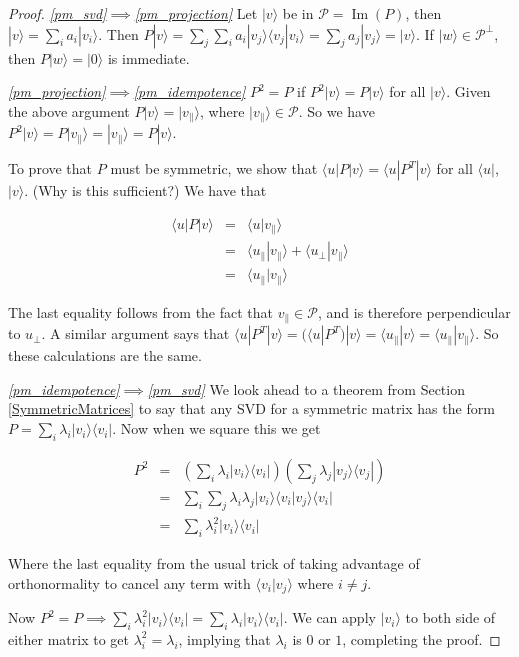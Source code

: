 \documentclass{amsbook}
\begin{document}
\begin{proof}
{\em \ref{pm_svd}$\implies$\ref{pm_projection}} Let $|v\rangle$ be in $\mathcal P=\operatorname{Im}(P)$, then $|v\rangle=\sum_ia_i|v_i\rangle$.  Then $P|v\rangle=\sum_j\sum_ia_i|v_j\rangle\langle v_j|v_i\rangle=\sum_ja_j|v_j\rangle=|v\rangle$.  If $|w\rangle\in\mathcal P^\bot$, then $P|w\rangle=|0\rangle$ is immediate.

{\em \ref{pm_projection}$\implies$\ref{pm_idempotence}}  $P^2=P$ if $P^2|v\rangle=P|v\rangle$ for all $|v\rangle$.  Given the above argument $P|v\rangle=|v_\parallel\rangle$, where $|v_\parallel\rangle\in\mathcal P$.  So we have $P^2|v\rangle=P|v_\parallel\rangle=|v_\parallel\rangle=P|v\rangle$.

To prove that $P$ must be symmetric, we show that $\langle u|P|v\rangle=\langle u|P^T|v\rangle$ for all $\langle u|$, $|v\rangle$.  (Why is this sufficient?)  We have that

$$
\begin{array}{rcl}
\langle u|P|v\rangle &=& \langle u|v_\parallel\rangle \\
&=& \langle u_\parallel|v_\parallel\rangle + \langle u_\bot|v_\parallel\rangle \\
&=& \langle u_\parallel|v_\parallel\rangle
\end{array}
$$

The last equality follows from the fact that $v_\parallel\in\mathcal P$, and is therefore perpendicular to $u_\bot$.  A similar argument says that $\langle u|P^T|v\rangle=(\langle u|P^T)|v\rangle=\langle u_\parallel|v\rangle=\langle u_\parallel|v_\parallel\rangle$.  So these calculations are the same.

{\em \ref{pm_idempotence}$\implies$\ref{pm_svd}}  We look ahead to a theorem from Section \ref{SymmetricMatrices} to say that any SVD for a symmetric matrix has the form $P=\sum_i\lambda_i|v_i\rangle\langle v_i|$.  Now when we square this we get

$$
\begin{array}{rcl}
P^2 &=& \left(\sum_i\lambda_i|v_i\rangle\langle v_i|\right)\left(\sum_j\lambda_j|v_j\rangle\langle v_j|\right) \\
&=& \sum_i\sum_j\lambda_i\lambda_j|v_i\rangle\langle v_i|v_j\rangle\langle v_i| \\
&=& \sum_i\lambda_i^2|v_i\rangle\langle v_i|
\end{array}
$$

Where the last equality from the usual trick of taking advantage of orthonormality to cancel any term with $\langle v_i|v_j\rangle$ where $i\neq j$.

Now $P^2=P\implies \sum_i\lambda_i^2|v_i\rangle\langle v_i|=\sum_i\lambda_i|v_i\rangle\langle v_i|$.  We can apply $|v_i\rangle$ to both side of either matrix to get $\lambda_i^2=\lambda_i$, implying that $\lambda_i$ is $0$ or $1$, completing the proof.
\end{proof}
\end{document}
